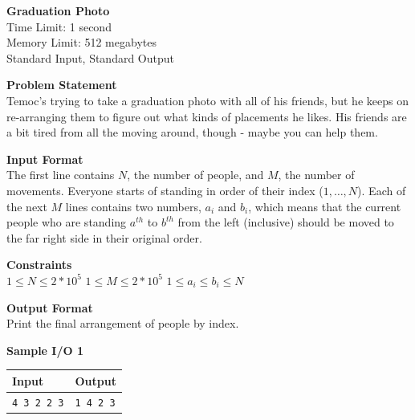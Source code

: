 \documentclass{article}
\begin{document}
\begin{center}
{\LARGE \bf Graduation Photo}\\
{\large Time Limit: 1 second}\\
{\large Memory Limit: 512 megabytes}\\
Standard Input, Standard Output
\end{center}

{\noindent \bf Problem Statement}\\
Temoc's trying to take a graduation photo with all of his friends, but he keeps on re-arranging them to figure out what kinds of placements he likes. His friends are a bit tired from all the moving around, though - maybe you can help them. \newline

{\noindent \bf Input Format}\\
The first line contains $N$, the number of people, and $M$, the number of movements. Everyone starts of standing in order of their index ($1, \dots, N$). Each of the next $M$ lines contains two numbers, $a_i$ and $b_i$, which means that the current people who are standing $a^{th}$ to $b^{th}$ from the left (inclusive) should be moved to the far right side in their original order. \newline

{\noindent \bf Constraints}\\
$1 \leq N \leq 2*10^5$ \newline
$1 \leq M \leq 2*10^5$ \newline
$1 \leq a_i \leq b_i \leq N$ \newline

{\noindent \bf Output Format}\\
Print the final arrangement of people by index. \newline

{\noindent \bf Sample I/O 1}\\
\begin{tabular}{|p{}|p{}|}
    \hline
    \textbf{Input} & \textbf{Output}\\
    \hline
    \texttt{4 3 \newline 1 2 \newline 1 2 \newline 2 3}
    &
    \texttt{1 4 2 3}\\
    \hline
\end{tabular} \newline \newline
\end{document}
